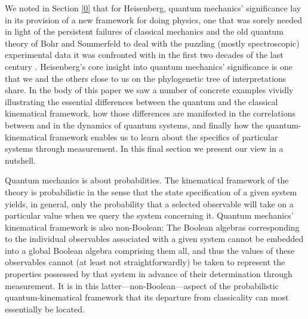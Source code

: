 

We noted in Section \ref{0} that for Heisenberg, quantum mechanics' significance lay in its provision of a new framework for doing physics, one that was sorely needed in light of the persistent failures of classical mechanics and the old quantum theory of Bohr and Sommerfeld to deal with the puzzling (mostly spectroscopic) experimental data it was confronted with in the first two decades of the last century \citep{Duncan and Janssen 2019}. Heisenberg's core insight into quantum mechanics' significance is one that we and the others close to us on the phylogenetic tree of interpretations share. In the body of this paper we saw a number of concrete examples vividly illustrating the essential differences between the quantum and the classical kinematical framework, how those differences are manifested in the correlations between and in the dynamics of quantum systems, and finally how the quantum-kinematical framework enables us to learn about the specifics of particular systems through measurement. In this final section we present our view in a nutshell.

Quantum mechanics is about probabilities. The kinematical framework of the theory is probabilistic in the sense that the state specification of a given system yields, in general, only the probability that a selected observable will take on a particular value when we query the system concerning it. Quantum mechanics' kinematical framework is also non-Boolean: The Boolean algebras corresponding to the individual observables associated with a given system cannot be embedded into a global Boolean algebra comprising them all, and thus the values of these observables cannot (at least not straightforwardly) be taken to represent the properties possessed by that system in advance of their determination through measurement. It is in this latter---non-Boolean---aspect of the probabilistic quantum-kinematical framework that its departure from classicality can most essentially be located.

